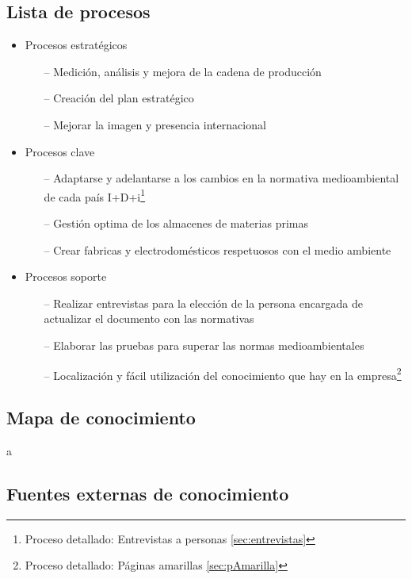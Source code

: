 \documentclass[a4paper]{article}
\begin{document}
\subsection{Lista de procesos}

\begin{itemize}
	\item Procesos estratégicos
	\begin{itemize}
		\item[--] Medición, análisis y mejora de la cadena de producción
		\item[--] Creación del plan estratégico
		\item[--] Mejorar la imagen y presencia internacional
	\end{itemize}
	\item Procesos clave
	\begin{itemize}
		\item[--] Adaptarse y adelantarse a los cambios en la normativa medioambiental de cada país I+D+i\footnote{Proceso detallado: Entrevistas a personas \ref{sec:entrevistas}}
		\item[--] Gestión optima de los almacenes de materias primas
		\item[--] Crear fabricas y electrodomésticos respetuosos con el medio ambiente
	\end{itemize}
	\item Procesos soporte
	\begin{itemize}
		\item[--] Realizar entrevistas para la elección de la persona encargada de actualizar el documento con las normativas
		\item[--] Elaborar las pruebas para superar las normas medioambientales
		\item[--] Localización y fácil utilización del conocimiento que hay en la empresa\footnote{Proceso detallado: Páginas amarillas \ref{sec:pAmarilla}}
	\end{itemize}
\end{itemize}




\subsection{Mapa de conocimiento}

a

\subsection{Fuentes externas de conocimiento}
\end{document}
